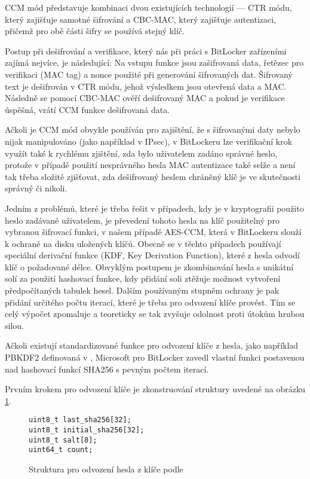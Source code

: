 CCM mód představuje kombinaci dvou existujících technologií --- CTR módu, který zajišťuje samotné šifrování a CBC-MAC, který zajišťuje autentizaci, přičemž pro obě části šifry se používá stejný klíč.

Postup při dešifrování a verifikace, který nás při práci s BitLocker zařízeními zajímá nejvíce, je následující: Na vstupu funkce jsou zašifrovaná data, řetězec pro verifikaci (MAC tag) a nonce použité při generování šifrovaných dat. Šifrovaný text je dešifrován v CTR módu, jehož výsledkem jsou otevřená data a MAC. Následně se pomocí CBC-MAC ověří dešifrovaný MAC a pokud je verifikace úspěšná, vrátí CCM funkce dešifrovaná data.\cite{Dworkin2004}

Ačkoli je CCM mód obvykle používán pro zajištění, že s šifrovanými daty nebylo nijak manipulováno (jako například v IPsec\cite{Housley2005}), v BitLockeru lze verifikační krok využít také k rychlému zjištění, zda bylo uživatelem zadáno správné heslo, protože v případě použití nesprávného hesla MAC autentizace také selže a není tak třeba složitě zjišťovat, zda dešifrovaný heslem chráněný klíč je ve skutečnosti správný či nikoli.

\label{sec:kdf}

Jedním z problémů, které je třeba řešit v případech, kdy je v kryptografii použito heslo zadávané uživatelem, je převedení tohoto hesla na klíč použitelný pro vybranou šifrovací funkci, v našem případě AES-CCM, která v BitLockeru slouží k ochraně na disku uložených klíčů. Obecně se v těchto případech používají speciální derivační funkce (KDF, Key Derivation Function), které z hesla odvodí klíč o požadované délce. Obvyklým postupem je zkombinování hesla s unikátní solí za použití hashovací funkce, kdy přidání soli ztěžuje možnost vytvoření předpočítaných tabulek hesel. Dalším používaným stupněm ochrany je pak přidání určitého počtu iterací, které je třeba pro odvození klíče provést. Tím se celý výpočet zpomaluje a teoreticky se tak zvyšuje odolnost proti útokům hrubou silou.\cite{Kaliski2000}

Ačkoli existují standardizované funkce pro odvození klíče z hesla, jako například PBKDF2 definovaná v \cite{Kaliski2000}, Microsoft pro BitLocker zavedl vlastní funkci postavenou nad hashovací funkcí SHA256 s pevným počtem iterací.

Prvním krokem pro odvození klíče je zkonstruování struktury uvedené na obrázku \ref{fig:bitlocker-kdf}.

\begin{figure}[h]
		\centering
		\captionsetup{width=0.65\linewidth}
\begin{lstlisting}[frame=none, escapechar=$, basicstyle=\ttfamily\small, columns=fullflexible, keepspaces=true, xleftmargin=.35\textwidth, xrightmargin=.35\textwidth]
uint8_t last_sha256[32];
uint8_t initial_sha256[32];
uint8_t salt[8];
uint64_t count;
\end{lstlisting}
		\caption{Struktura pro odvození hesla z klíče podle \cite{Metz2011}}
		\label{fig:bitlocker-kdf}
\end{figure}

